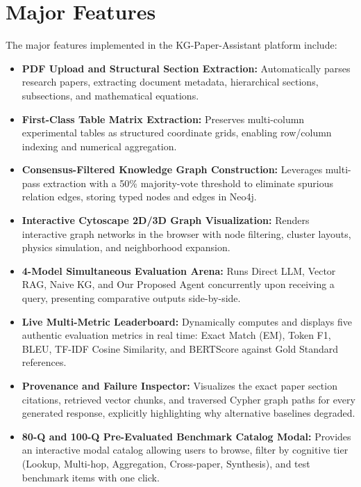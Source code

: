 \documentclass[12pt,a4paper,oneside]{report}
\begin{document}
\section{Major Features}
The major features implemented in the KG-Paper-Assistant platform include:
\begin{itemize}
    \item \textbf{PDF Upload and Structural Section Extraction:} Automatically parses research papers, extracting document metadata, hierarchical sections, subsections, and mathematical equations.
    \item \textbf{First-Class Table Matrix Extraction:} Preserves multi-column experimental tables as structured coordinate grids, enabling row/column indexing and numerical aggregation.
    \item \textbf{Consensus-Filtered Knowledge Graph Construction:} Leverages multi-pass extraction with a 50\% majority-vote threshold to eliminate spurious relation edges, storing typed nodes and edges in Neo4j.
    \item \textbf{Interactive Cytoscape 2D/3D Graph Visualization:} Renders interactive graph networks in the browser with node filtering, cluster layouts, physics simulation, and neighborhood expansion.
    \item \textbf{4-Model Simultaneous Evaluation Arena:} Runs Direct LLM, Vector RAG, Naive KG, and Our Proposed Agent concurrently upon receiving a query, presenting comparative outputs side-by-side.
    \item \textbf{Live Multi-Metric Leaderboard:} Dynamically computes and displays five authentic evaluation metrics in real time: Exact Match (EM), Token F1, BLEU, TF-IDF Cosine Similarity, and BERTScore against Gold Standard references.
    \item \textbf{Provenance and Failure Inspector:} Visualizes the exact paper section citations, retrieved vector chunks, and traversed Cypher graph paths for every generated response, explicitly highlighting why alternative baselines degraded.
    \item \textbf{80-Q and 100-Q Pre-Evaluated Benchmark Catalog Modal:} Provides an interactive modal catalog allowing users to browse, filter by cognitive tier (Lookup, Multi-hop, Aggregation, Cross-paper, Synthesis), and test benchmark items with one click.
\end{itemize}
\end{document}
